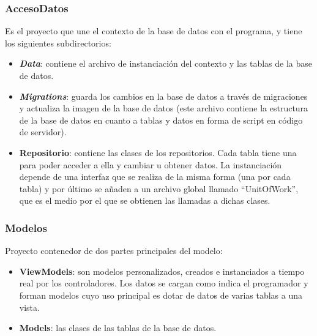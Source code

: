 \subsubsection{AccesoDatos}
Es el proyecto que une el contexto de la base de datos con el programa, y tiene los siguientes subdirectorios:
\begin{itemize}
    \item \textbf{\emph{Data}}: contiene el archivo de instanciación del contexto y las tablas de la base de datos.
    \item \textbf{\emph{Migrations}}: guarda los cambios en la base de datos a través de migraciones y actualiza la imagen de la base de datos (este archivo contiene la estructura de la base de datos en cuanto a tablas y datos en forma de script en código de servidor).
    \item \textbf{Repositorio}: contiene las clases de los repositorios. Cada tabla tiene una
    para poder acceder a ella y cambiar u obtener datos. La instanciación depende de una interfaz
    que se realiza de la misma forma (una por cada tabla) y por último se añaden a un archivo global llamado ``UnitOfWork'', que es el medio por el que se obtienen las llamadas a dichas clases.
\end{itemize}

\subsubsection{Modelos}
Proyecto contenedor de dos partes principales del modelo:
\begin{itemize}
    \item \textbf{ViewModels}: son modelos personalizados, creados e instanciados a tiempo real
    por los controladores. Los datos se cargan como indica el programador y forman modelos cuyo
    uso principal es dotar de datos de varias tablas a una vista.
    \item \textbf{Models}: las clases de las tablas de la base de datos.
\end{itemize}

